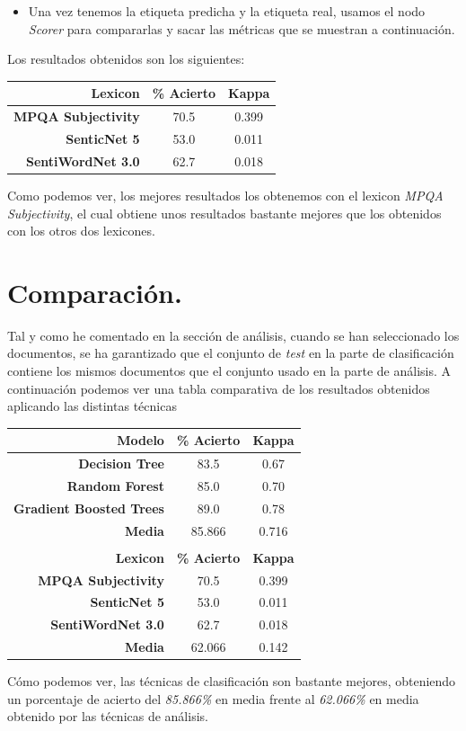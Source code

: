 \documentclass[11pt]{article}
\begin{document}
\begin{itemize}
	\item Una vez tenemos la etiqueta predicha y la etiqueta real, usamos el nodo \textit{Scorer} para compararlas y sacar las métricas que se muestran a continuación.
\end{itemize}

Los resultados obtenidos son los siguientes: 

\begin{table}[H]
	\centering
	\begin{tabular}{rcc}
		\textbf{Lexicon} & \textbf{\% Acierto} & \textbf{Kappa} \\ \hline
		\textbf{MPQA Subjectivity} & 70.5 & 0.399 \\
		\textbf{SenticNet 5} & 53.0 & 0.011 \\
		\textbf{SentiWordNet 3.0} & 62.7 & 0.018
	\end{tabular}
\end{table}

Como podemos ver, los mejores resultados los obtenemos con el lexicon \textit{MPQA Subjectivity}, el cual obtiene unos resultados bastante mejores que los obtenidos con los otros dos lexicones.

\section{Comparación.}

Tal y como he comentado en la sección de análisis, cuando se han seleccionado los documentos, se ha garantizado que el conjunto de \textit{test} en la parte de clasificación contiene los mismos documentos que el conjunto usado en la parte de análisis. A continuación podemos ver una tabla comparativa de los resultados obtenidos aplicando las distintas técnicas

\begin{table}[H]
	\centering
	\begin{tabular}{rcc}
		\textbf{Modelo} & \textbf{\% Acierto} & \textbf{Kappa} \\ \hline
		\textbf{Decision Tree} & 83.5 & 0.67 \\
		\textbf{Random Forest} & 85.0 & 0.70 \\
		\textbf{Gradient Boosted Trees} & 89.0 & 0.78 \\ \hline
		\textbf{Media} & 85.866 & 0.716 \\
		\textbf{} &  &  \\
		\textbf{Lexicon} & \textbf{\% Acierto} & \textbf{Kappa} \\ \hline
		\textbf{MPQA Subjectivity} & 70.5 & 0.399 \\
		\textbf{SenticNet 5} & 53.0 & 0.011 \\
		\textbf{SentiWordNet 3.0} & 62.7 & 0.018 \\ \hline
		\textbf{Media} & 62.066 & 0.142
	\end{tabular}
\end{table}

Cómo podemos ver, las técnicas de clasificación son bastante mejores, obteniendo un porcentaje de acierto del \textit{85.866\%} en media frente al \textit{62.066\%} en media obtenido por las técnicas de análisis.
\end{document}
